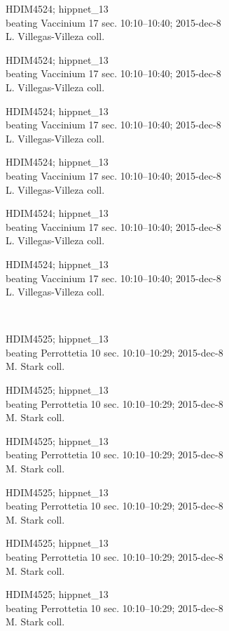 \documentclass[2pt]{extarticle}
\begin{document}
\noindent
\parbox{0.16\textwidth}{\tiny \raggedright \rule[-0.3\baselineskip]{0pt}{10pt}HDIM4524; hippnet\_13\\ beating Vaccinium 17 sec. 10:10--10:40; 2015-dec-8\\ L. Villegas-Villeza coll.}
\parbox{0.16\textwidth}{\tiny \raggedright \rule[-0.3\baselineskip]{0pt}{10pt}HDIM4524; hippnet\_13\\ beating Vaccinium 17 sec. 10:10--10:40; 2015-dec-8\\ L. Villegas-Villeza coll.}
\parbox{0.16\textwidth}{\tiny \raggedright \rule[-0.3\baselineskip]{0pt}{10pt}HDIM4524; hippnet\_13\\ beating Vaccinium 17 sec. 10:10--10:40; 2015-dec-8\\ L. Villegas-Villeza coll.}
\parbox{0.16\textwidth}{\tiny \raggedright \rule[-0.3\baselineskip]{0pt}{10pt}HDIM4524; hippnet\_13\\ beating Vaccinium 17 sec. 10:10--10:40; 2015-dec-8\\ L. Villegas-Villeza coll.}
\parbox{0.16\textwidth}{\tiny \raggedright \rule[-0.3\baselineskip]{0pt}{10pt}HDIM4524; hippnet\_13\\ beating Vaccinium 17 sec. 10:10--10:40; 2015-dec-8\\ L. Villegas-Villeza coll.}
\parbox{0.16\textwidth}{\tiny \raggedright \rule[-0.3\baselineskip]{0pt}{10pt}HDIM4524; hippnet\_13\\ beating Vaccinium 17 sec. 10:10--10:40; 2015-dec-8\\ L. Villegas-Villeza coll.} \\ 
\vspace{0.001in} 

\noindent
\parbox{0.16\textwidth}{\tiny \raggedright \rule[-0.3\baselineskip]{0pt}{10pt}HDIM4525; hippnet\_13\\ beating Perrottetia 10 sec. 10:10--10:29; 2015-dec-8\\ M. Stark coll.}
\parbox{0.16\textwidth}{\tiny \raggedright \rule[-0.3\baselineskip]{0pt}{10pt}HDIM4525; hippnet\_13\\ beating Perrottetia 10 sec. 10:10--10:29; 2015-dec-8\\ M. Stark coll.}
\parbox{0.16\textwidth}{\tiny \raggedright \rule[-0.3\baselineskip]{0pt}{10pt}HDIM4525; hippnet\_13\\ beating Perrottetia 10 sec. 10:10--10:29; 2015-dec-8\\ M. Stark coll.}
\parbox{0.16\textwidth}{\tiny \raggedright \rule[-0.3\baselineskip]{0pt}{10pt}HDIM4525; hippnet\_13\\ beating Perrottetia 10 sec. 10:10--10:29; 2015-dec-8\\ M. Stark coll.}
\parbox{0.16\textwidth}{\tiny \raggedright \rule[-0.3\baselineskip]{0pt}{10pt}HDIM4525; hippnet\_13\\ beating Perrottetia 10 sec. 10:10--10:29; 2015-dec-8\\ M. Stark coll.}
\parbox{0.16\textwidth}{\tiny \raggedright \rule[-0.3\baselineskip]{0pt}{10pt}HDIM4525; hippnet\_13\\ beating Perrottetia 10 sec. 10:10--10:29; 2015-dec-8\\ M. Stark coll.} \\ 
\vspace{0.001in} 
\end{document}
